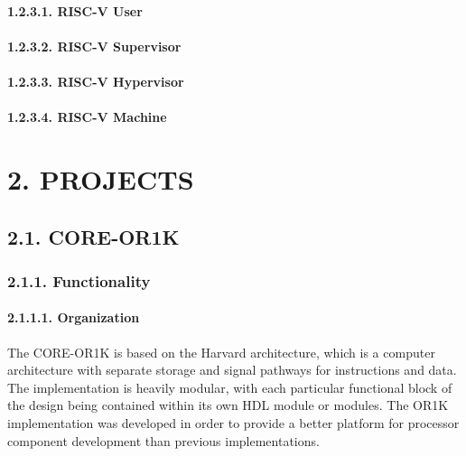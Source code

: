 \documentclass[]{article}
\let\oldparagraph\paragraph
\renewcommand{\paragraph}[1]{\oldparagraph{#1}\mbox{}}
\begin{document}
\paragraph{1.2.3.1. RISC-V User}\label{risc-v-user}

\paragraph{1.2.3.2. RISC-V Supervisor}\label{risc-v-supervisor}

\paragraph{1.2.3.3. RISC-V Hypervisor}\label{risc-v-hypervisor}

\paragraph{1.2.3.4. RISC-V Machine}\label{risc-v-machine}

\section{2. PROJECTS}\label{projects}

\subsection{2.1. CORE-OR1K}\label{core-or1k}

\subsubsection{2.1.1. Functionality}\label{functionality}

\paragraph{2.1.1.1. Organization}\label{organization}

The CORE-OR1K is based on the Harvard architecture, which is a computer
architecture with separate storage and signal pathways for instructions
and data. The implementation is heavily modular, with each particular
functional block of the design being contained within its own HDL module
or modules. The OR1K implementation was developed in order to provide a
better platform for processor component development than previous
implementations.
\end{document}
